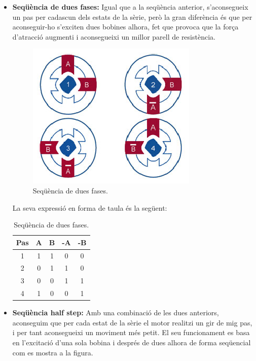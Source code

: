 \begin{itemize}
	\item \textbf{Seqüència de dues fases:} Igual que a la seqüència anterior, s'aconsegueix un pas per cadascun dels estats de la sèrie, però la gran diferència és que per aconseguir-ho s'exciten dues bobines alhora, fet que provoca que la força d'atracció augmenti i aconsegueixi un millor parell de resistència. 
	\begin{figure}[H]
		\centering
		\includegraphics[scale=1.2]{Sequencia_2_fases.eps}
		\caption{Seqüència de dues fases.}
		\label{fig:Sequencia de dos fase}
	\end{figure}
	La seva expressió en forma de taula és la següent:
	\begin{table}[H]
		\begin{center}
			\begin{tabular}{|c||c|c|c|c|}
				\hline
				Pas & A & B & -A & -B \\
				\hline \hline
				1 & 1 & 1 & 0 & 0 \\ \hline
				2 & 0 & 1 & 1 & 0 \\ \hline
				3 & 0 & 0 & 1 & 1 \\ \hline
				4 & 1 & 0 & 0 & 1 \\ \hline
			\end{tabular}
			\caption{Seqüència de dues fases.}
			\label{tabla:2fase}
		\end{center}
	\end{table}
	
	\item \textbf{Seqüència half step:} Amb una combinació de les dues anteriors, aconseguim que per cada estat de la sèrie el motor realitzi un gir de mig pas, i per tant aconsegueixi un moviment més petit. El seu funcionament es basa en l'excitació d'una sola bobina i després de dues alhora de forma seqüencial com es mostra  a la figura.
	

\end{itemize}
